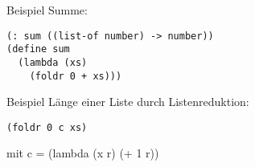 \documentclass[a4paper, 20pt, openany]{book}
\begin{document}
Beispiel Summe:

\begin{lstlisting}
(: sum ((list-of number) -> number))
(define sum
  (lambda (xs)
    (foldr 0 + xs)))
\end{lstlisting}

Beispiel Länge einer Liste durch Listenreduktion:

\begin{lstlisting}
(foldr 0 c xs)
\end{lstlisting}

mit c = (lambda (x r) (+ 1 r))
\end{document}
